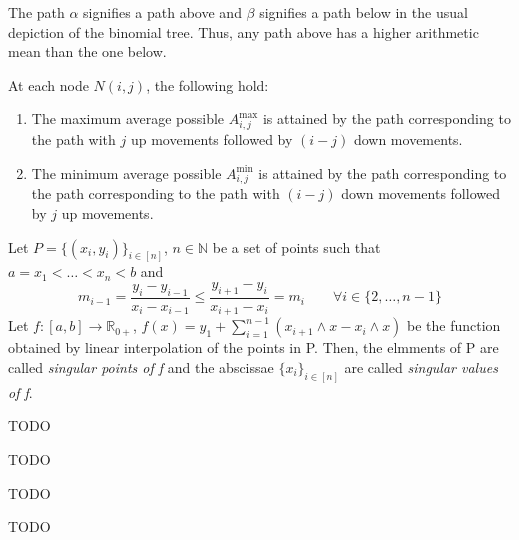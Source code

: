 \begin{rem}
  The path $\alpha$ signifies a path above and $\beta$ signifies a path below in the usual depiction of the binomial tree. Thus, any path above  has a higher arithmetic mean than the one below.
\end{rem}


\begin{crr}
  \label{crr:up-dn-path}
  At each node $N(i,j)$, the following hold:
  \begin{enumerate}
  \item The maximum average possible $ A_{i,j}^{\max} $ is attained by the path corresponding to the path with $j$ up movements followed by $(i-j)$ down movements.
  \item The minimum average possible $ A_{i,j}^{\min} $ is attained by the path corresponding to the path corresponding to the path with $(i-j)$ down movements followed by $j$ up movements.
  \end{enumerate}
\end{crr}


\begin{dfn}
  Let $ P = \{ (x_i, y_i)  \}_{i \in [n]} $, $ n \in \mathbb{N} $ be a set of points such that $ a = x_1 < \dots < x_n < b $ and
  \begin{equation*}
    m_{i-1} = \frac{y_{i} - y_{i-1}}{x_{i} - x_{i-1}} \leq \frac{y_{i+1} - y_{i}}{x_{i+1} - x_{i}} = m_{i} \qquad \forall i \in \{ 2, \dots, n-1 \}
  \end{equation*}
  Let $ f:[a,b] \to \mathbb{R}_{0+} $, $ f(x) = y_1 + \sum_{i=1}^{n-1} (x_{i+1} \wedge x - x_{i} \wedge x) $ be the function obtained by linear interpolation of the points in P.
  Then, the elmments of P are called \emph{singular points of f} and the abscissae $ \{ x_i \}_{i \in [n]} $ are called \emph{singular values of f}.
\end{dfn}


\begin{lmm}[Lemma 1]
  TODO
\end{lmm}


\begin{lmm}[Lemma 2]
  TODO
\end{lmm}


\begin{lmm}[Lemma 3]
  TODO
\end{lmm}


\begin{lmm}[Lemma 4]
  TODO
\end{lmm}


